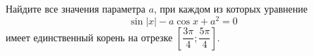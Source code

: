 \begin{ex}
	\begin{condition}
		Найдите все значения параметра \( a \), при каждом из которых уравнение \[ \sin|x| - a\cos x+a^2=0 \] имеет единственный корень на отрезке \( \left[ \dfrac{3\pi}{4};\dfrac{5\pi}{4} \right] \).
	\end{condition}
\end{ex}